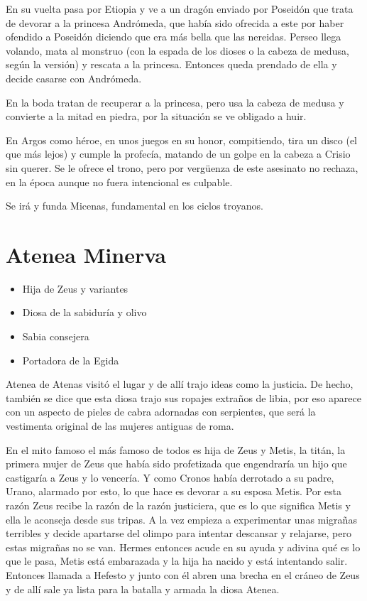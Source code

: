 En su vuelta pasa por Etiopia y ve a un dragón enviado por Poseidón que trata de devorar a la princesa Andrómeda, que había sido ofrecida a este por haber ofendido a Poseidón diciendo que era más bella que las nereidas. Perseo llega volando, mata al monstruo (con la espada de los dioses o la cabeza de medusa, según la versión) y rescata a la princesa. Entonces queda prendado de ella y decide casarse con Andrómeda.

En la boda tratan de recuperar a la princesa, pero usa la cabeza de medusa y convierte a la mitad en piedra, por la situación se ve obligado a huir.

En Argos como héroe, en unos juegos en su honor, compitiendo, tira un disco (el que más lejos) y cumple la profecía, matando de un golpe en la cabeza a Crisio sin querer. Se le ofrece el trono, pero por vergüenza de este asesinato no rechaza, en la época aunque no fuera intencional es culpable.

Se irá y funda Micenas, fundamental en los ciclos troyanos.

\section{Atenea Minerva}
\begin{itemize}
	\item Hija de Zeus y variantes
	\item Diosa de la sabiduría y olivo
	\item Sabia consejera
	\item Portadora de la Egida
\end{itemize}

Atenea de Atenas visitó el lugar y de allí trajo ideas como la justicia. De hecho, también se dice que esta diosa trajo sus ropajes extraños de libia, por eso aparece con un aspecto de pieles de cabra adornadas con serpientes, que será la vestimenta original de las mujeres antiguas de roma.

En el mito famoso el más famoso de todos es hija de Zeus y Metis, la titán, la primera mujer de Zeus que había sido profetizada que engendraría un hijo que castigaría a Zeus y lo vencería. Y como Cronos había derrotado a su padre, Urano, alarmado por esto, lo que hace es devorar a su esposa Metis. Por esta razón Zeus recibe la razón de la razón justiciera, que es lo que significa Metis y ella le aconseja desde sus tripas. A la vez empieza a experimentar unas migrañas terribles y decide apartarse del olimpo para intentar descansar y relajarse, pero estas migrañas no se van. Hermes entonces acude en su ayuda y adivina qué es lo que le pasa, Metis está embarazada y la hija ha nacido y está intentando salir. Entonces llamada a Hefesto y junto con él abren una brecha en el cráneo de Zeus y de allí sale ya lista para la batalla y armada la diosa Atenea.

